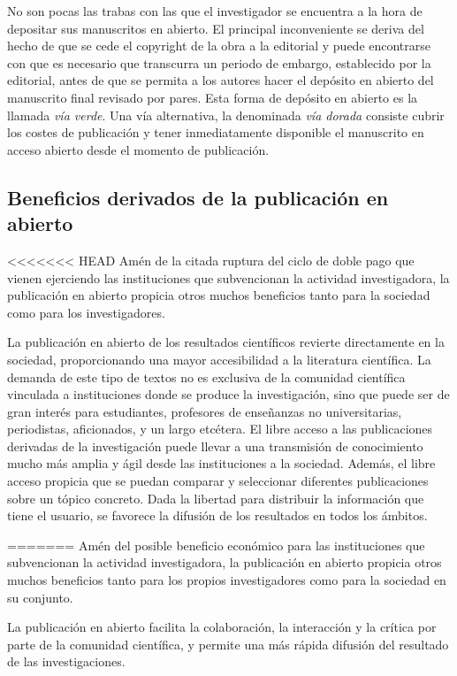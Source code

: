 \documentclass[10pt,twoside,spanish]{article}
\numberwithin{equation}{section}
\begin{document}
No son pocas las trabas con las que el investigador se encuentra a la hora de depositar sus manuscritos en abierto. El principal inconveniente se deriva del hecho de que se cede el copyright de la obra a la editorial y puede encontrarse con que es necesario que transcurra un periodo de embargo, establecido por la editorial, antes de que se permita a los autores hacer el depósito en abierto del manuscrito final revisado por pares. Esta forma de depósito en abierto es la llamada {\em vía verde}. Una vía alternativa, la denominada {\em vía dorada} consiste cubrir los costes de publicación y tener inmediatamente disponible el manuscrito en acceso abierto desde el momento de publicación.

\subsection{Beneficios derivados de la publicación en abierto}

<<<<<<< HEAD
Amén de la citada ruptura del ciclo de doble pago que vienen ejerciendo las instituciones que subvencionan la actividad investigadora, la publicación en abierto propicia otros muchos beneficios tanto para la sociedad como para los investigadores.

La publicación en abierto de los resultados científicos revierte directamente en la sociedad, proporcionando una mayor accesibilidad a la literatura científica. La demanda de este tipo de textos no es exclusiva de la comunidad científica vinculada a instituciones donde se produce la investigación, sino que puede ser de gran interés para estudiantes, profesores de enseñanzas no universitarias, periodistas, aficionados, y un largo etcétera. El libre acceso a las publicaciones derivadas de la investigación puede llevar a una transmisión de conocimiento mucho más amplia y ágil desde las instituciones a la sociedad. Además, el libre acceso propicia que se puedan comparar y seleccionar diferentes publicaciones sobre un tópico concreto. Dada la libertad para distribuir la información que tiene el usuario, se favorece la difusión de los resultados en todos los ámbitos.

=======
Amén del posible beneficio económico para las instituciones que subvencionan la actividad investigadora, la publicación en abierto propicia otros muchos beneficios tanto para los propios investigadores como para la sociedad en su conjunto.

La publicación en abierto facilita la colaboración, la interacción y la crítica por parte de la comunidad científica, y permite una más rápida difusión del resultado de las investigaciones.
\end{document}
